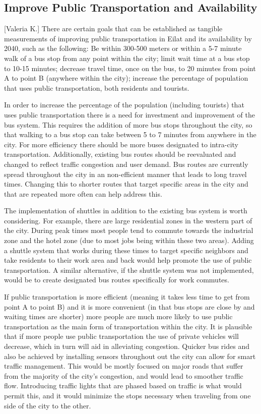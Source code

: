 \documentclass[12pt]{article}                               %
\begin{document}
\subsection{Improve Public Transportation and Availability}[Valeria K.] \label{sec:disc_improve_transport}
There are certain goals that can be established as tangible measurements of improving public transportation in Eilat and its availability by 2040, such as the following: Be within 300-500 meters or within a 5-7 minute walk of a bus stop from any point within the city; limit wait time at a bus stop to 10-15 minutes; decrease travel time, once on the bus, to 20 minutes from point A to point B (anywhere within the city); increase the percentage of population that uses public transportation, both residents and tourists.

In order to increase the percentage of the population (including tourists) that uses public transportation there is a need for investment and improvement of the bus system. This requires the addition of more bus stops throughout the city, so that walking to a bus stop can take between 5 to 7 minutes from anywhere in the city. For more efficiency there should be more buses designated to intra-city transportation. Additionally, existing bus routes should be reevaluated and changed to reflect traffic congestion and user demand. Bus routes are currently spread throughout the city in an non-efficient manner that leads to long travel times. Changing this to shorter routes that target specific areas in the city and that are repeated more often can help address this.

The implementation of shuttles in addition to the existing bus system is worth considering. For example, there are large residential zones in the western part of the city. During peak times most people tend to commute towards the industrial zone and the hotel zone (due to most jobs being within these two areas). Adding a shuttle system that works during these times to target specific neighbors and take residents to their work area and back would help promote the use of public transportation. A similar alternative, if the shuttle system was not implemented, would be to create designated bus routes specifically for work commutes.
    
If public transportation is more efficient (meaning it takes less time to get from point A to point B) and it is more convenient (in that bus stops are close by and waiting times are shorter) more people are much more likely to use public transportation as the main form of transportation within the city. It is plausible that if more people use public transportation the use of private vehicles will decrease, which in turn will aid in alleviating congestion. Quicker bus rides and also be achieved by installing sensors throughout out the city can allow for smart traffic management. This would be mostly focused on major roads that suffer from the majority of the city's congestion, and would lead to smoother traffic flow. Introducing traffic lights that are phased based on traffic is what would permit this, and it would minimize the stops necessary when traveling from one side of the city to the other.
\end{document}
